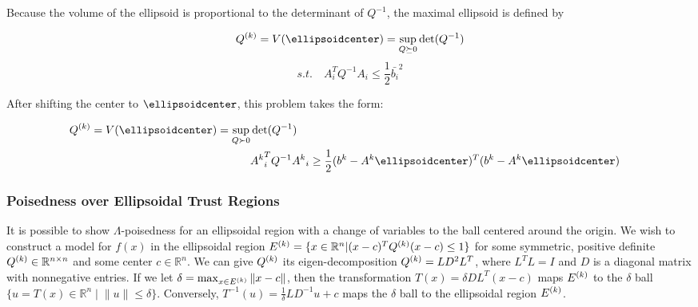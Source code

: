 Because the volume of the ellipsoid is proportional to the determinant of $Q^{-1}$, the maximal ellipsoid is defined by

\[
\qk = V(\ellipsoidcenter) = \sup_{Q \succeq 0} \det(Q^{-1})
\]
\[
s.t. \quad A_i^T Q^{-1} A_i \le \frac 1 2 \bar{b_i}^2
\]



After shifting the center to $\ellipsoidcenter$, this problem takes the form:

\begin{center}
\begin{align}
\label{ellipse_1}
\qk = V(\ellipsoidcenter) = \sup_{Q \succ 0} & \det(Q^{-1}) & \\
  & {A^k}_i^T Q^{-1} {A^k}_i \ge \frac 1 2 (b^k - A^k\ellipsoidcenter)^T(b^k - A^k \ellipsoidcenter) & \nonumber
\end{align}
\end{center}


\subsubsection{Poisedness over Ellipsoidal Trust Regions}
\label{ellipsoidal_lambda}

It is possible to show $\Lambda$-poisedness for an ellipsoidal region with a change of variables to the ball centered around the origin.
We wish to construct a model for $f(x)$ in the ellipsoidal region
${E^{(k)}} = \{x \in \mathbb R^n | (x - c)^T{Q^{(k)}}(x - c) \le 1\}$ for some symmetric, positive definite
${Q^{(k)}} \in \mathbb R^{n\times n}$ and some center $c \in \mathbb R^n$.
We can give ${Q^{(k)}}$ its eigen-decomposition ${Q^{(k)}} = L D^2 L^T$, where $L^TL = I$ and $D$ is a diagonal matrix with nonnegative entries.
If we let $\delta = \max_{x\in {E^{(k)}}}\|x-c\|$, then the transformation $T(x) = \delta DL^T(x - c)$ maps $ {E^{(k)}} $ to the $\delta$ ball $\{u = T(x) \in \mathbb R^n \; | \; \|u\| \le \delta\}$.
Conversely, $ T^{-1}(u) = \frac 1 {\delta} LD^{-1}u + c$ maps the $\delta$ ball to the ellipsoidal region $ {E^{(k)}} $.


